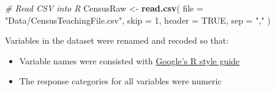 \documentclass[]{book}
\newenvironment{Shaded}{\begin{snugshade}}{\end{snugshade}}
\newcommand{\KeywordTok}[1]{\textcolor[rgb]{0.13,0.29,0.53}{\textbf{#1}}}
\newcommand{\DataTypeTok}[1]{\textcolor[rgb]{0.13,0.29,0.53}{#1}}
\newcommand{\DecValTok}[1]{\textcolor[rgb]{0.00,0.00,0.81}{#1}}
\newcommand{\StringTok}[1]{\textcolor[rgb]{0.31,0.60,0.02}{#1}}
\newcommand{\CommentTok}[1]{\textcolor[rgb]{0.56,0.35,0.01}{\textit{#1}}}
\newcommand{\OtherTok}[1]{\textcolor[rgb]{0.56,0.35,0.01}{#1}}
\newcommand{\NormalTok}[1]{#1}
\providecommand{\tightlist}{%
  \setlength{\itemsep}{0pt}\setlength{\parskip}{0pt}}
\begin{document}
\begin{Shaded}
\begin{Highlighting}[]
\CommentTok{# Read CSV into R}
\NormalTok{CensusRaw <-}\StringTok{ }\KeywordTok{read.csv}\NormalTok{(}
  \DataTypeTok{file =} \StringTok{"Data/CensusTeachingFile.csv"}\NormalTok{, }\DataTypeTok{skip =} \DecValTok{1}\NormalTok{,}
  \DataTypeTok{header =} \OtherTok{TRUE}\NormalTok{, }\DataTypeTok{sep =} \StringTok{","}
\NormalTok{)}
\end{Highlighting}
\end{Shaded}

Variables in the dataset were renamed and recoded so that:

\begin{itemize}
\tightlist
\item
  Variable names were consisted with
  \href{https://google.github.io/styleguide/Rguide.xml}{Google's R style
  guide}
\item
  The response categories for all variables were numeric
\end{itemize}
\end{document}

